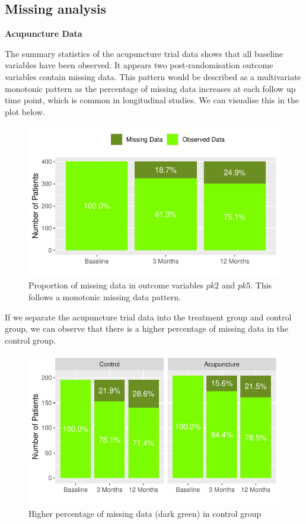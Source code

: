 \documentclass{article}
\newcommand{\pandocbounded}[1]{#1}
\begin{document}
\newpage

\subsection{Missing analysis}\label{missing-analysis}

\textbf{Acupuncture Data}

The summary statistics of the acupuncture trial data shows that all
baseline variables have been observed. It appears two post-randomisation
outcome variables contain missing data. This pattern would be described
as a multivariate monotonic pattern as the percentage of missing data
increases at each follow up time point, which is common in longitudinal
studies. We can visualise this in the plot below.

\begin{figure}
\centering
\pandocbounded{\includegraphics[keepaspectratio]{Final_Report_files/figure-latex/unnamed-chunk-18-1.pdf}}
\caption{Proportion of missing data in outcome variables \(pk2\) and
\(pk5\). This follows a monotonic missing data pattern.}
\end{figure}

If we separate the acupuncture trial data into the treatment group and
control group, we can observe that there is a higher percentage of
missing data in the control group.

\begin{figure}
\centering
\pandocbounded{\includegraphics[keepaspectratio]{Final_Report_files/figure-latex/unnamed-chunk-19-1.pdf}}
\caption{Higher percentage of missing data (dark green) in control
group}
\end{figure}
\end{document}
